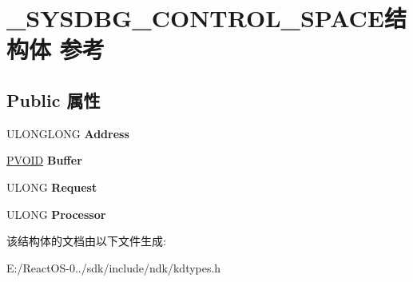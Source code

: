 \hypertarget{struct___s_y_s_d_b_g___c_o_n_t_r_o_l___s_p_a_c_e}{}\section{\+\_\+\+S\+Y\+S\+D\+B\+G\+\_\+\+C\+O\+N\+T\+R\+O\+L\+\_\+\+S\+P\+A\+C\+E结构体 参考}
\label{struct___s_y_s_d_b_g___c_o_n_t_r_o_l___s_p_a_c_e}
\subsection*{Public 属性}
\begin{DoxyCompactItemize}
\item 
\mbox{\label{struct___s_y_s_d_b_g___c_o_n_t_r_o_l___s_p_a_c_e_ab16f58ad10c17afb2003d699f0b56360}} 
U\+L\+O\+N\+G\+L\+O\+NG {\bfseries Address}
\item 
\mbox{\label{struct___s_y_s_d_b_g___c_o_n_t_r_o_l___s_p_a_c_e_ae211b1559f1d5701f9dcc4ec4356c60b}} 
\hyperlink{interfacevoid}{P\+V\+O\+ID} {\bfseries Buffer}
\item 
\mbox{\label{struct___s_y_s_d_b_g___c_o_n_t_r_o_l___s_p_a_c_e_a6bdb83ed25bc4f3b719e1eb5fd505652}} 
U\+L\+O\+NG {\bfseries Request}
\item 
\mbox{\label{struct___s_y_s_d_b_g___c_o_n_t_r_o_l___s_p_a_c_e_a271deec54a09e3f7c395d678c2fb0077}} 
U\+L\+O\+NG {\bfseries Processor}
\end{DoxyCompactItemize}


该结构体的文档由以下文件生成\+:\begin{DoxyCompactItemize}
\item 
E\+:/\+React\+O\+S-\/0../sdk/include/ndk/kdtypes.\+h\end{DoxyCompactItemize}
